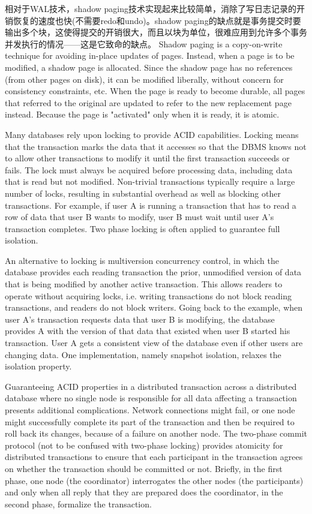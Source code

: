相对于WAL技术，shadow paging技术实现起来比较简单，消除了写日志记录的开销恢复的速度也快(不需要redo和undo)。shadow paging的缺点就是事务提交时要输出多个块，这使得提交的开销很大，而且以块为单位，很难应用到允许多个事务并发执行的情况——这是它致命的缺点。
Shadow paging is a copy-on-write technique for avoiding in-place updates of pages. Instead, when a page is to be modified, a shadow page is allocated. Since the shadow page has no references (from other pages on disk), it can be modified liberally, without concern for consistency constraints, etc. When the page is ready to become durable, all pages that referred to the original are updated to refer to the new replacement page instead. Because the page is "activated" only when it is ready, it is atomic.

Many databases rely upon locking to provide ACID capabilities. Locking means that the transaction marks the data that it accesses so that the DBMS knows not to allow other transactions to modify it until the first transaction succeeds or fails. The lock must always be acquired before processing data, including data that is read but not modified. Non-trivial transactions typically require a large number of locks, resulting in substantial overhead as well as blocking other transactions. For example, if user A is running a transaction that has to read a row of data that user B wants to modify, user B must wait until user A's transaction completes. Two phase locking is often applied to guarantee full isolation.

An alternative to locking is multiversion concurrency control, in which the database provides each reading transaction the prior, unmodified version of data that is being modified by another active transaction. This allows readers to operate without acquiring locks, i.e. writing transactions do not block reading transactions, and readers do not block writers. Going back to the example, when user A's transaction requests data that user B is modifying, the database provides A with the version of that data that existed when user B started his transaction. User A gets a consistent view of the database even if other users are changing data. One implementation, namely snapshot isolation, relaxes the isolation property.

Guaranteeing ACID properties in a distributed transaction across a distributed database where no single node is responsible for all data affecting a transaction presents additional complications. Network connections might fail, or one node might successfully complete its part of the transaction and then be required to roll back its changes, because of a failure on another node. The two-phase commit protocol (not to be confused with two-phase locking) provides atomicity for distributed transactions to ensure that each participant in the transaction agrees on whether the transaction should be committed or not. Briefly, in the first phase, one node (the coordinator) interrogates the other nodes (the participants) and only when all reply that they are prepared does the coordinator, in the second phase, formalize the transaction.

